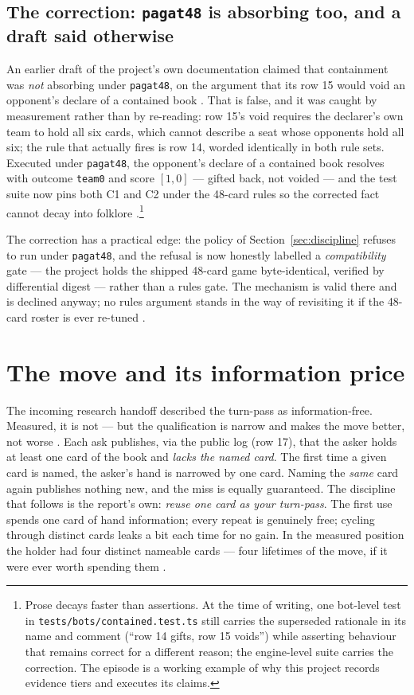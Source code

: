 \documentclass[11pt]{article}
\newcommand{\code}[1]{\texttt{#1}}
\begin{document}
\subsection{The correction: \code{pagat48} is absorbing too, and a draft said otherwise}
\label{sec:correction}

An earlier draft of the project's own documentation claimed that containment
was \emph{not} absorbing under \code{pagat48}, on the argument that its row 15
would void an opponent's declare of a contained book \cite{styles}. That is
false, and it was caught by measurement rather than by re-reading: row 15's
void requires the declarer's own team to hold all six cards, which cannot
describe a seat whose opponents hold all six; the rule that actually fires is
row 14, worded identically in both rule sets. Executed under \code{pagat48},
the opponent's declare of a contained book resolves with outcome \code{team0}
and score $[1,0]$ --- gifted back, not voided --- and the test suite now pins
both C1 and C2 under the 48-card rules so the corrected fact cannot decay into
folklore \cite{styles}.\footnote{Prose decays faster than assertions. At the
time of writing, one bot-level test in
\code{tests/bots/contained.test.ts} still carries the superseded rationale in
its name and comment (``row 14 gifts, row 15 voids'') while asserting behaviour
that remains correct for a different reason; the engine-level suite carries the
correction. The episode is a working example of why this project records
evidence tiers and executes its claims.}

The correction has a practical edge: the policy of
Section~\ref{sec:discipline} refuses to run under \code{pagat48}, and the
refusal is now honestly labelled a \emph{compatibility} gate --- the project
holds the shipped 48-card game byte-identical, verified by differential digest
--- rather than a rules gate. The mechanism is valid there and is declined
anyway; no rules argument stands in the way of revisiting it if the 48-card
roster is ever re-tuned \cite{styles}.

\section{The move and its information price}
\label{sec:move}

The incoming research handoff described the turn-pass as information-free.
Measured, it is not --- but the qualification is narrow and makes the move
better, not worse \cite{containment}. Each ask publishes, via the public log
(row 17), that the asker holds at least one card of the book and \emph{lacks
the named card}. The first time a given card is named, the asker's hand is
narrowed by one card. Naming the \emph{same} card again publishes nothing new,
and the miss is equally guaranteed. The discipline that follows is the
report's own: \emph{reuse one card as your turn-pass}. The first use spends
one card of hand information; every repeat is genuinely free; cycling through
distinct cards leaks a bit each time for no gain. In the measured position the
holder had four distinct nameable cards --- four lifetimes of the move, if it
were ever worth spending them \cite{containment}.
\end{document}
